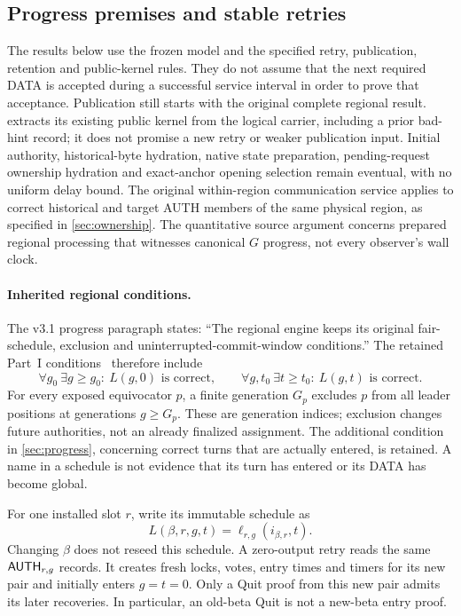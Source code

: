 \subsection{Progress premises and stable retries}
\label{sec:v35-progress-premises}
The results below use the frozen model and the specified retry,
publication, retention and public-kernel rules. They do not assume that
the next required DATA is accepted during a successful service interval
in order to prove that acceptance. Publication still starts with the
original complete regional result. 
extracts its existing public kernel from the logical carrier, including
a prior bad-hint record; it does not promise a new retry or weaker
publication input. Initial authority, historical-byte hydration, native
state preparation, pending-request ownership hydration and exact-anchor
opening selection remain eventual, with no uniform delay bound. The
original within-region communication service applies to correct
historical and target AUTH members of the same physical region, as
specified in \cref{sec:ownership}. The quantitative source argument
concerns prepared regional processing that witnesses canonical $G$
progress, not every observer's wall clock.

\paragraph{Inherited regional conditions.}
The v3.1 progress paragraph states: ``The regional engine keeps its
original fair-schedule, exclusion and uninterrupted-commit-window
conditions.'' The retained Part~I conditions~\cite{part1} therefore
include
\[
 \forall g_0\ \exists g\ge g_0:\ L(g,0)\text{ is correct},\qquad
 \forall g,t_0\ \exists t\ge t_0:\ L(g,t)\text{ is correct}.
\]
For every exposed equivocator $p$, a finite generation $G_p$ excludes
$p$ from all leader positions at generations $g\ge G_p$. These are
generation indices; exclusion changes future authorities, not an
already finalized assignment. The additional condition in
\cref{sec:progress}, concerning correct turns that are actually entered,
is retained. A name in a schedule is not evidence that its turn has
entered or its DATA has become global.

For one installed slot $r$, write its immutable schedule as
\[
 L(\beta,r,g,t)=\ell_{r,g}(i_{\beta,r},t).
\]
Changing $\beta$ does not reseed this schedule. A zero-output retry reads
the same $\mathsf{AUTH}_{r,g}$ records. It creates fresh locks, votes,
entry times and timers for its new pair and initially enters $g=t=0$.
Only a Quit proof from this new pair admits its later recoveries.
In particular, an old-beta Quit is not a new-beta entry proof.

